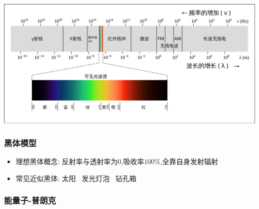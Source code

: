 \documentclass{article}
\begin{document}
\includegraphics[width=37em,keepaspectratio]{./pictures/6.png}

\vspace{2em}

\subsubsection{黑体模型}
\begin{itemize}
    \item 理想黑体概念: 反射率与透射率为$0$,吸收率$100\%$,全靠自身发射辐射
    \item[] 常见近似黑体: 太阳 \, 发光灯泡 \, 钻孔箱
\end{itemize}

\vspace{2em}

\subsubsection{能量子-普朗克}
\end{document}

